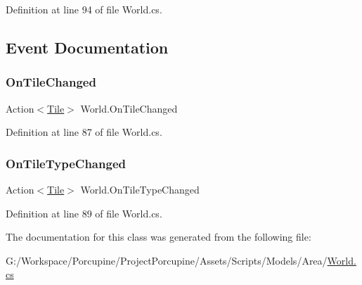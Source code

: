 Definition at line 94 of file World.\+cs.



\subsection{Event Documentation}
\mbox{\label{class_world_adbd4a4649f58585850e61318f28647f8}} 
\subsubsection{\texorpdfstring{On\+Tile\+Changed}{OnTileChanged}}
{\footnotesize\ttfamily Action$<$\hyperlink{class_tile}{Tile}$>$ World.\+On\+Tile\+Changed}



Definition at line 87 of file World.\+cs.

\mbox{\label{class_world_a9bb57a09d4ab53f9c69117402509772a}} 
\subsubsection{\texorpdfstring{On\+Tile\+Type\+Changed}{OnTileTypeChanged}}
{\footnotesize\ttfamily Action$<$\hyperlink{class_tile}{Tile}$>$ World.\+On\+Tile\+Type\+Changed}



Definition at line 89 of file World.\+cs.



The documentation for this class was generated from the following file\+:\begin{DoxyCompactItemize}
\item 
G\+:/\+Workspace/\+Porcupine/\+Project\+Porcupine/\+Assets/\+Scripts/\+Models/\+Area/\hyperlink{_world_8cs}{World.\+cs}\end{DoxyCompactItemize}
